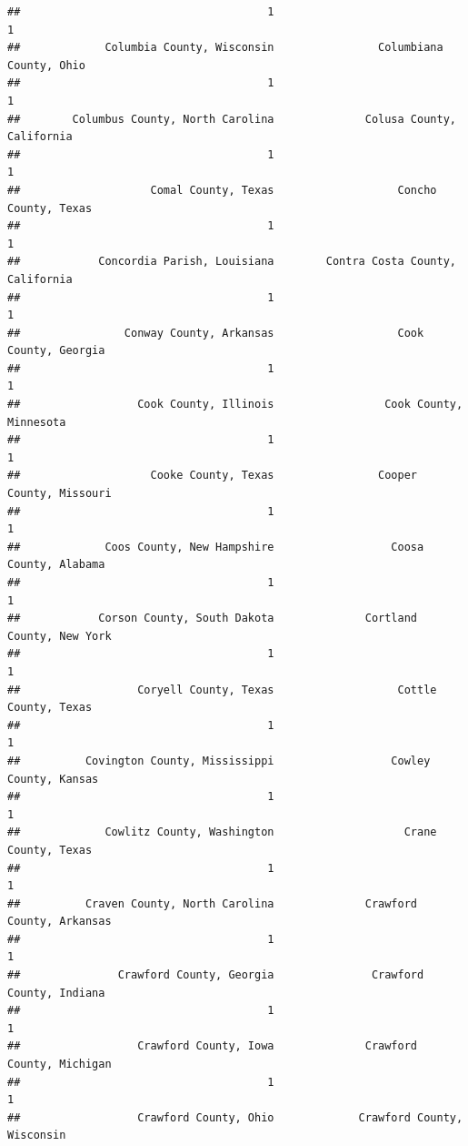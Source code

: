 \documentclass[
]{article}
\begin{document}
\begin{verbatim}
##                                      1                                      1 
##             Columbia County, Wisconsin                Columbiana County, Ohio 
##                                      1                                      1 
##        Columbus County, North Carolina              Colusa County, California 
##                                      1                                      1 
##                    Comal County, Texas                   Concho County, Texas 
##                                      1                                      1 
##            Concordia Parish, Louisiana        Contra Costa County, California 
##                                      1                                      1 
##                Conway County, Arkansas                   Cook County, Georgia 
##                                      1                                      1 
##                  Cook County, Illinois                 Cook County, Minnesota 
##                                      1                                      1 
##                    Cooke County, Texas                Cooper County, Missouri 
##                                      1                                      1 
##             Coos County, New Hampshire                  Coosa County, Alabama 
##                                      1                                      1 
##            Corson County, South Dakota              Cortland County, New York 
##                                      1                                      1 
##                  Coryell County, Texas                   Cottle County, Texas 
##                                      1                                      1 
##          Covington County, Mississippi                  Cowley County, Kansas 
##                                      1                                      1 
##             Cowlitz County, Washington                    Crane County, Texas 
##                                      1                                      1 
##          Craven County, North Carolina              Crawford County, Arkansas 
##                                      1                                      1 
##               Crawford County, Georgia               Crawford County, Indiana 
##                                      1                                      1 
##                  Crawford County, Iowa              Crawford County, Michigan 
##                                      1                                      1 
##                  Crawford County, Ohio             Crawford County, Wisconsin 

\end{verbatim}
\end{document}
